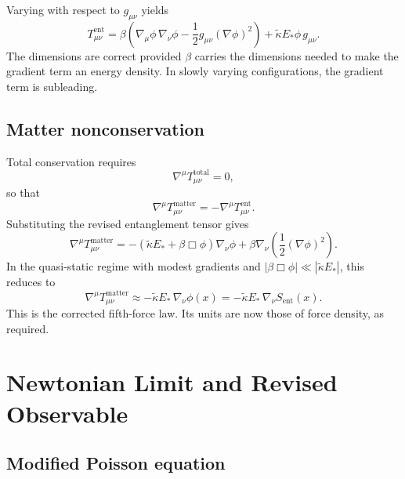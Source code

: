 \documentclass[11pt]{article}
\begin{document}
Varying with respect to $g_{\mu\nu}$ yields
\begin{equation}
T^{\mathrm{ent}}_{\mu\nu} = \beta\left(\nabla_\mu\phi\,\nabla_\nu\phi - \frac{1}{2}g_{\mu\nu}(\nabla\phi)^2\right) + \tilde{\kappa} E_*\phi\, g_{\mu\nu}.
\end{equation}
The dimensions are correct provided $\beta$ carries the dimensions needed to make the gradient term an energy density. In slowly varying configurations, the gradient term is subleading.

\subsection{Matter nonconservation}

Total conservation requires
\begin{equation}
\nabla^\mu T^{\mathrm{total}}_{\mu\nu} = 0,
\end{equation}
so that
\begin{equation}
\nabla^\mu T^{\mathrm{matter}}_{\mu\nu} = -\nabla^\mu T^{\mathrm{ent}}_{\mu\nu}.
\end{equation}
Substituting the revised entanglement tensor gives
\begin{equation}
\nabla^\mu T^{\mathrm{matter}}_{\mu\nu} = -\left(\tilde{\kappa} E_* + \beta\Box\phi\right)\nabla_\nu\phi + \beta\nabla_\nu\left(\frac{1}{2}(\nabla\phi)^2\right).
\end{equation}
In the quasi-static regime with modest gradients and $|\beta\Box\phi| \ll |\tilde{\kappa}E_*|$, this reduces to
\begin{equation}
\nabla^\mu T^{\mathrm{matter}}_{\mu\nu} \approx -\tilde{\kappa}E_*\,\nabla_\nu\phi(x) = -\tilde{\kappa}E_*\,\nabla_\nu S_{\mathrm{ent}}(x).
\end{equation}
This is the corrected fifth-force law. Its units are now those of force density, as required.

\section{Newtonian Limit and Revised Observable}

\subsection{Modified Poisson equation}
\end{document}
